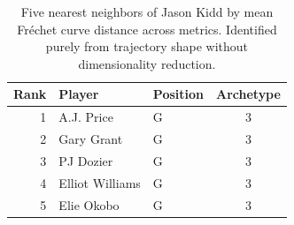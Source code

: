 \begin{table}[htbp]
  \centering\small
  \begin{tabular}{rllc}
    \toprule
    Rank & Player & Position & Archetype \\
    \midrule
    1 & A.J. Price & G & 3 \\
    2 & Gary Grant & G & 3 \\
    3 & PJ Dozier & G & 3 \\
    4 & Elliot Williams & G & 3 \\
    5 & Elie Okobo & G & 3 \\
    \bottomrule
  \end{tabular}
  \caption{Five nearest neighbors of Jason Kidd by mean Fr\'{e}chet curve distance across metrics. Identified purely from trajectory shape without dimensionality reduction.}
  \label{tab:Jason_Kidd_frechet_curve_neighbors}
\end{table}

